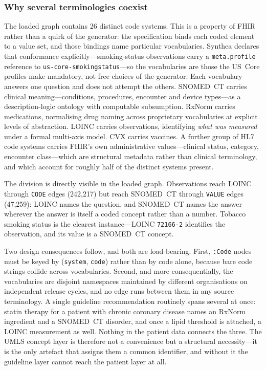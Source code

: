 \subsubsection*{Why several terminologies coexist}
\label{sec:multi-vocab}
The loaded graph contains 26 distinct code systems. This is a property of FHIR
rather than a quirk of the generator: the specification binds each coded element to a value
set, and those bindings name particular vocabularies. Synthea declares that conformance
explicitly---smoking-status observations carry a \texttt{meta.profile} reference to
\texttt{us-core-smokingstatus}---so the vocabularies are those the US~Core profiles make
mandatory, not free choices of the generator. Each vocabulary answers one question and
does not attempt the others. SNOMED~CT \cite{snomedct} carries clinical meaning---conditions,
procedures, encounter and device types---as a description-logic ontology with computable
subsumption. RxNorm \cite{rxnorm} carries medications, normalising drug naming across
proprietary vocabularies at explicit levels of abstraction. LOINC \cite{loinc} carries
observations, identifying \emph{what was measured} under a formal multi-axis model. CVX
carries vaccines. A further group of HL7 code systems carries FHIR's own administrative
values---clinical status, category, encounter class---which are structural metadata rather
than clinical terminology, and which account for roughly half of the distinct systems present.

The division is directly visible in the loaded graph. Observations reach LOINC through
\texttt{CODE} edges (242{,}217) but reach SNOMED~CT through \texttt{VALUE} edges
(47{,}259): LOINC names the question, and SNOMED~CT names the answer wherever the
answer is itself a coded concept rather than a number. Tobacco smoking status is the clearest
instance---LOINC \texttt{72166-2} identifies the observation, and its value is a SNOMED~CT
concept.

Two design consequences follow, and both are load-bearing. First, \texttt{:Code} nodes must be
keyed by (\texttt{system}, \texttt{code}) rather than by code alone, because bare code strings
collide across vocabularies. Second, and more consequentially, the vocabularies are disjoint
namespaces maintained by different organisations on independent release cycles, and no edge
runs between them in any source terminology. A single guideline recommendation routinely spans
several at once: statin therapy for a patient with chronic coronary disease names an RxNorm
ingredient and a SNOMED~CT disorder, and once a lipid threshold is attached, a LOINC
measurement as well. Nothing in the patient data connects the three. The UMLS concept layer is
therefore not a convenience but a structural necessity---it is the only artefact that assigns
them a common identifier, and without it the guideline layer cannot reach the patient layer at
all.


